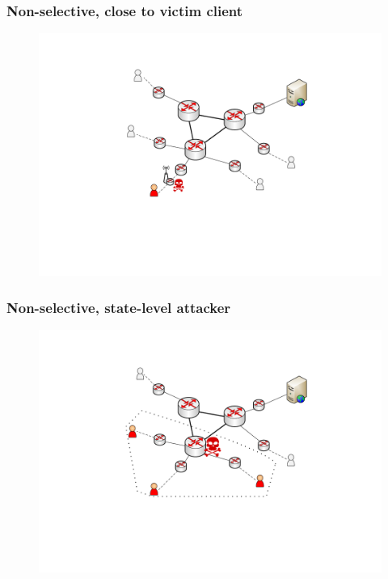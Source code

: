 \begin{frame}
\frametitle{Non-selective, close to victim client}
\begin{block}{}
  \begin{figure}[t]
    \centering
    \includegraphics[scale=.5]{figures/scenario1-close-to-ap.pdf}
  \end{figure}
\end{block}
\end{frame}



\begin{frame}
\frametitle{Non-selective, state-level attacker}
\begin{block}{}
  \begin{figure}[t]
    \centering
    \includegraphics[scale=.5]{figures/scenario5-stateattacker-non-selective.pdf}
  \end{figure}
\end{block}
\end{frame}




